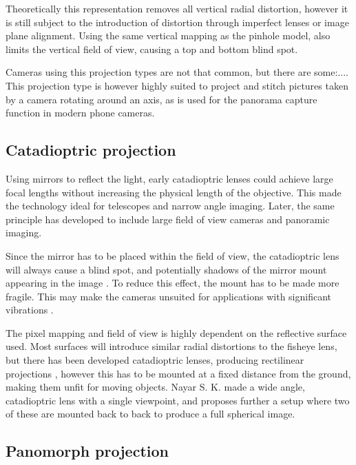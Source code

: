 Theoretically this representation removes all vertical radial distortion, however it is still subject to the introduction of distortion through imperfect lenses or image plane alignment. Using the same vertical mapping as the pinhole model, also limits the vertical field of view, causing a top and bottom blind spot.

Cameras using this projection types are not that common, but there are some:.... This projection type is however highly suited to project and stitch pictures taken by a camera rotating around an axis, as is used for the panorama capture function in modern phone cameras.

\subsection{Catadioptric projection}

Using mirrors to reflect the light, early catadioptric lenses could achieve large focal lengths without increasing the physical length of the objective. This made the technology ideal for telescopes and narrow angle imaging. Later, the same principle has developed to include large field of view cameras and panoramic imaging. 

Since the mirror has to be placed within the field of view, the catadioptric lens will always cause a blind spot, and potentially shadows of the mirror mount appearing in the image . To reduce this effect, the mount has to be made more fragile. This may make the cameras unsuited for applications with significant vibrations .

The pixel mapping and field of view is highly dependent on the reflective surface used. Most surfaces will introduce similar radial distortions to the fisheye lens, but there has been developed catadioptric lenses, producing rectilinear projections , however this has to be mounted at a fixed distance from the ground, making them unfit for moving objects. Nayar S. K. made a wide angle, catadioptric lens  with a single viewpoint, and proposes further a setup where two of these are mounted back to back to produce a full spherical image. 


\subsection{Panomorph projection}


